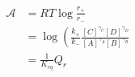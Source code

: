 \begin{eqnarray}\label{eqn:reaction-affinity-ratio}
\mathcal A &= RT\log\frac{r_+}{r_-} \\
& = \log\left(\frac{k_+}{k_-}\frac{[C]^{\gamma_C}[D]^{\gamma_D}}{[A]^{\gamma_A}[B]^{\gamma_B}} \\
& = \frac{1}{K_{eq}}{Q_r} \\
\end{eqnarray}